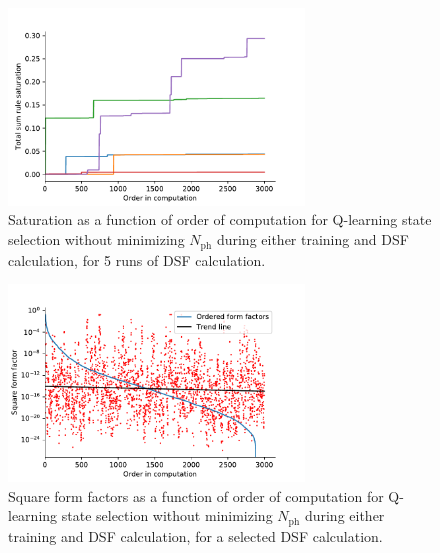 \documentclass[11pt, a4paper]{report} %
\begin{document}
\begin{figure}[tb!]
  \centering
  \includegraphics[width=0.7\textwidth]{saturation_histories_rand_False_check_train_False_check_eval_False.pdf}
  \caption{Saturation as a function of order of computation for Q-learning state selection without minimizing \(N_{\mathrm{ph}}\) during either training and DSF calculation, for 5 runs of DSF calculation.}
  \label{fig:saturation_histories_rand_False_check_train_False_check_eval_False}
\end{figure}

\begin{figure}[tb!]
  \centering
  \includegraphics[width=0.7\textwidth]{ff_sizes_rand_False_check_train_False_check_eval_False.pdf}
  \caption{Square form factors as a function of order of computation for Q-learning state selection without minimizing \(N_{\mathrm{ph}}\) during either training and DSF calculation, for a selected DSF calculation.}
  \label{fig:ff_sizes_rand_False_check_train_False_check_eval_False}
\end{figure}
\end{document}
